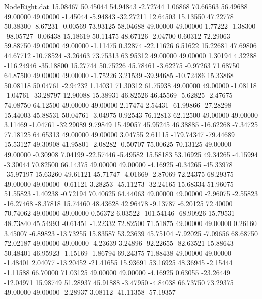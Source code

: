 \begin{filecontents}{NodeRight.dat}
  15.08467   50.45044   54.94843    -2.72744    1.06868   70.66563   56.49688   49.00000   49.00000   -1.45044   -5.94843  -32.27211   12.64503
  15.13550   47.22778   50.38300    -8.67231   -0.00569   73.93125   58.04688   49.00000   49.00000    1.77222   -1.38300  -98.05727   -0.06438
  15.18619   50.11475   48.67126    -2.04700    0.60312   72.29063   59.88750   49.00000   49.00000   -1.11475    0.32874  -22.11626    6.51622
  15.22681   47.69806   44.67712   -10.78524   -3.26463   73.75313   63.95312   49.00000   49.00000    1.30194    4.32288 -116.24946  -35.18800
  15.27744   50.75226   45.78461    -3.62275   -0.97263   71.68750   64.87500   49.00000   49.00000   -1.75226    3.21539  -39.94685  -10.72486
  15.33868   50.08118   50.04761    -2.94232    1.14031   71.30312   61.75938   49.00000   49.00000   -1.08118   -1.04761  -33.28797   12.90088
  15.38931   46.82526   46.45569    -5.62825   -2.47675   74.08750   64.12500   49.00000   49.00000    2.17474    2.54431  -61.99866  -27.28298
  15.44003   45.88531   50.04761    -3.04975    0.92543   76.12813   62.12500   49.00000   49.00000    3.11469   -1.04761  -32.29089    9.79849
  15.49057   45.95245   46.38885   -16.62268   -7.34725   77.18125   64.65313   49.00000   49.00000    3.04755    2.61115 -179.74347  -79.44689
  15.53127   49.30908   41.95801    -2.08282   -0.50707   75.00625   70.13125   49.00000   49.00000   -0.30908    7.04199  -22.57446   -5.49582
  15.58183   53.16925   49.34265    -4.15994   -3.30044   70.82500   66.14375   49.00000   49.00000   -4.16925   -0.34265  -45.33978  -35.97197
  15.63260   49.61121   45.71747    -4.01669   -2.87069   72.24375   68.29375   49.00000   49.00000   -0.61121    3.28253  -45.11273  -32.24165
  15.68334   51.96075   51.55823    -1.40238   -0.72194   70.40625   64.44063   49.00000   49.00000   -2.96075   -2.55823  -16.27468   -8.37818
  15.74460   48.43628   42.96478    -9.13787   -6.20125   72.40000   70.74062   49.00000   49.00000    0.56372    6.03522 -101.54146  -68.90926
  15.79531   48.73840   45.54993    -0.61451   -1.22332   72.82500   71.51875   49.00000   49.00000    0.26160    3.45007   -6.89823  -13.73255
  15.83587   53.23639   45.75104    -7.92025   -7.09656   68.68750   72.02187   49.00000   49.00000   -4.23639    3.24896  -92.22655  -82.63521
  15.88643   50.48401   46.95923    -1.15169   -1.86794   69.24375   71.88438   49.00000   49.00000   -1.48401    2.04077  -13.20452  -21.41655
  15.93691   53.16925   48.36945    -2.15444   -1.11588   66.70000   71.03125   49.00000   49.00000   -4.16925    0.63055  -23.26449  -12.04971
  15.98749   51.28937   45.91888    -3.47950   -4.84038   66.73750   73.29375   49.00000   49.00000   -2.28937    3.08112  -41.11358  -57.19357

\end{filecontents}
